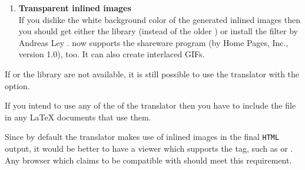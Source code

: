 \begin{enumerate}
%
%
\item 
\textbf{Transparent inlined images}\\
If you dislike the white background color of the
generated inlined images then you should get either 
the  library (instead of the older ) 
or install the 
filter by Andreas Ley . 
\latextohtml{} now supports the shareware program 
(by Home Pages, Inc., version 1.0), too.
It can also create interlaced GIFs.
%
\end{enumerate} 

%

\noindent
If  or the  library are
not available, it is still possible to use the translator with the
 option. 

%
%
\html{\\}%

If you intend to use any of the 
of the translator 
then you have to include the  file 
in any \LaTeX{}  documents that use them. 

%
%
%
%
%
%
\html{\\}%

Since by default the translator makes use of inlined images in the final 
\texttt{HTML} output, it would be better to have a viewer 
which supports the  tag,
such as %
or .
Any browser which claims to be compatible with \HTMLiii{} should meet
this requirement.

%
%
\html{\\}%


